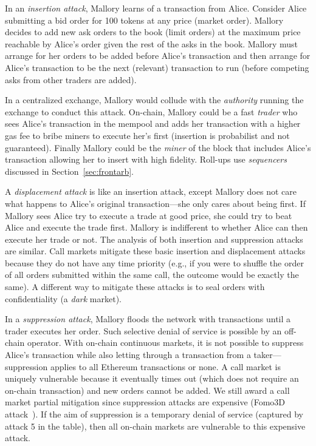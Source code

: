 In an \emph{insertion attack}, Mallory learns of a transaction from Alice. Consider Alice submitting a bid order for 100 tokens at any price (market order). Mallory decides to add new ask orders to the book (limit orders) at the maximum price reachable by Alice's order given the rest of the asks in the book. Mallory must arrange for her orders to be added before Alice's transaction and then arrange for Alice's transaction to be the next (relevant) transaction to run (\eg before competing asks from other traders are added).

In a centralized exchange, Mallory would collude with the \emph{authority} running the exchange to conduct this attack. On-chain, Mallory could be a fast \emph{trader} who sees Alice's transaction in the mempool and adds her transaction with a higher gas fee to bribe miners to execute her's first (insertion is probabilist and not guaranteed). Finally Mallory could be the \emph{miner} of the block that includes Alice's transaction allowing her to insert with high fidelity. Roll-ups use \emph{sequencers} discussed in Section~\ref{sec:frontarb}.
 
A \emph{displacement attack} is like an insertion attack, except Mallory does not care what happens to Alice's original transaction---she only cares about being first. If Mallory sees Alice try to execute a trade at good price, she could try to beat Alice and execute the trade first. Mallory is indifferent to whether Alice can then execute her trade or not. The analysis of both insertion and suppression attacks are similar.  Call markets mitigate these basic insertion and displacement attacks because they do not have any time priority (e.g., if you were to shuffle the order of all orders submitted within the same call, the outcome would be exactly the same). A different way to mitigate these attacks is to seal orders with confidentiality (a \textit{dark} market). 

In a \emph{suppression attack}, Mallory floods the network with transactions until a trader executes her order. Such selective denial of service is possible by an off-chain operator. With on-chain continuous markets, it is not possible to suppress Alice's transaction while also letting through a transaction from a taker---suppression applies to all Ethereum transactions or none. A call market is uniquely vulnerable because it eventually times out (which does not require an on-chain transaction) and new orders cannot be added. We still award a call market partial mitigation since suppression attacks are expensive (\cf Fomo3D attack~\cite{eskandari2019sok}). If the aim of suppression is a temporary denial of service (captured by attack 5 in the table), then all on-chain markets are vulnerable to this expensive attack.

